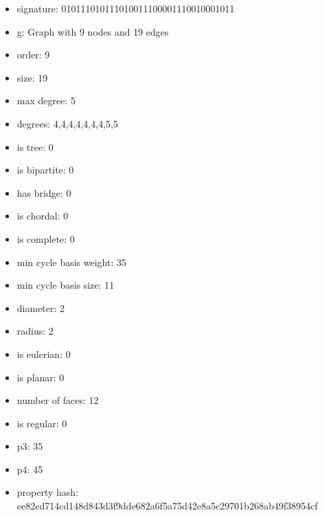 \newpage
\begin{figure}
\end{figure}
\begin{itemize}
\item signature: 010111010111010011100001110010001011
\item g: Graph with 9 nodes and 19 edges
\item order: 9
\item size: 19
\item max degree: 5
\item degrees: 4,4,4,4,4,4,4,5,5
\item is tree: 0
\item is bipartite: 0
\item has bridge: 0
\item is chordal: 0
\item is complete: 0
\item min cycle basis weight: 35
\item min cycle basis size: 11
\item diameter: 2
\item radius: 2
\item is eulerian: 0
\item is planar: 0
\item number of faces: 12
\item is regular: 0
\item p3: 35
\item p4: 45
\item property hash: ee82cd714cd148d843d3f9dde682a6f5a75d42e8a5c29701b268ab49f38954cf
\end{itemize}
